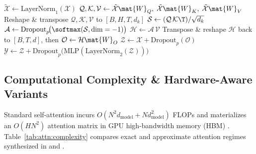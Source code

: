 \documentclass[../../../../master.tex]{subfiles}
\begin{document}
\begin{algorithm}[htbp]
\caption{Batched Causal Multi-Head Self-Attention \& Pre-LN Transformer Block}
\label{alg:attn:causal_mha_preln}
$\tilde{\mathcal{X}} \leftarrow \mathrm{LayerNorm}_1(\mathcal{X})$ 
$\mathcal{Q}, \mathcal{K}, \mathcal{V} \leftarrow \tilde{\mathcal{X}}\mat{W}_Q,\; \tilde{\mathcal{X}}\mat{W}_K,\; \tilde{\mathcal{X}}\mat{W}_V$ 
Reshape \& transpose $\mathcal{Q}, \mathcal{K}, \mathcal{V}$ to $[B, H, T, d_k]$\;
$\mathcal{S} \leftarrow (\mathcal{Q} \, \mathcal{K}\T) / \sqrt{d_k}$ 
$\mathcal{A} \leftarrow \mathrm{Dropout}_p\!\big(\softmax(\mathcal{S}, \mathrm{dim}=-1)\big)$ 
$\mathcal{H} \leftarrow \mathcal{A} \, \mathcal{V}$ 
Transpose \& reshape $\mathcal{H}$ back to $[B, T, d]$, then $\mathcal{O} \leftarrow \mathcal{H}\mat{W}_O$\;
$\mathcal{Z} \leftarrow \mathcal{X} + \mathrm{Dropout}_p(\mathcal{O})$ 
$\mathcal{Y} \leftarrow \mathcal{Z} + \mathrm{Dropout}_p\!\big(\mathrm{MLP}(\mathrm{LayerNorm}_2(\mathcal{Z}))\big)$ 
\;
\end{algorithm}

\subsection{Computational Complexity \& Hardware-Aware Variants}

Standard self-attention incurs $O(N^2 d_{\mathrm{model}} + N d_{\mathrm{model}}^2)$ FLOPs and materializes an $O(H N^2)$ attention matrix in GPU high-bandwidth memory (HBM) . Table~\ref{tab:attn:complexity} compares exact and approximate attention regimes synthesized in  and .
\end{document}
